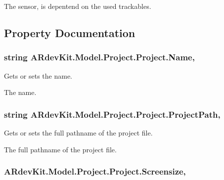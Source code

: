 The sensor, is depentend on the used trackables. 



\subsection{Property Documentation}
\hypertarget{class_a_rdev_kit_1_1_model_1_1_project_1_1_project_ae52006b6ebb8293ff034e8e00fdc4e77}{
\subsubsection[{Name}]{\setlength{\rightskip}{0pt plus 5cm}string A\-Rdev\-Kit.\-Model.\-Project.\-Project.\-Name\hspace{0.3cm}{\ttfamily [get]}, {\ttfamily [set]}}}\label{class_a_rdev_kit_1_1_model_1_1_project_1_1_project_ae52006b6ebb8293ff034e8e00fdc4e77}


Gets or sets the name. 

The name. \hypertarget{class_a_rdev_kit_1_1_model_1_1_project_1_1_project_ad1061c35bc3ffb4caefebce4f22c365c}{
\subsubsection[{Project\-Path}]{\setlength{\rightskip}{0pt plus 5cm}string A\-Rdev\-Kit.\-Model.\-Project.\-Project.\-Project\-Path\hspace{0.3cm}{\ttfamily [get]}, {\ttfamily [set]}}}\label{class_a_rdev_kit_1_1_model_1_1_project_1_1_project_ad1061c35bc3ffb4caefebce4f22c365c}


Gets or sets the full pathname of the project file. 

The full pathname of the project file. \hypertarget{class_a_rdev_kit_1_1_model_1_1_project_1_1_project_afe6b2e85505c01075fbc52a0cc851ce9}{
\subsubsection[{Screensize}]{ A\-Rdev\-Kit.\-Model.\-Project.\-Project.\-Screensize\hspace{0.3cm}{\ttfamily [get]}, {\ttfamily [set]}}}\label{class_a_rdev_kit_1_1_model_1_1_project_1_1_project_afe6b2e85505c01075fbc52a0cc851ce9}


